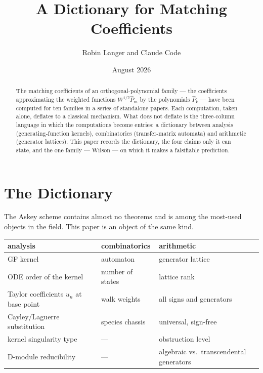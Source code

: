 \documentclass[11pt,a4paper]{article}
\title{\textbf{A Dictionary for Matching Coefficients}}
\author{Robin Langer and Claude Code}
\date{August 2026}
\begin{document}
\maketitle

\begin{abstract}
\noindent
The matching coefficients of an orthogonal-polynomial family --- the
coefficients approximating the weighted functions $W^{1/2}\widehat{P}_m$
by the polynomials $\widehat{P}_k$ --- have been computed for ten
families in a series of standalone papers. Each computation, taken
alone, deflates to a classical mechanism. What does not deflate is the
three-column language in which the computations become entries: a
dictionary between analysis (generating-function kernels), combinatorics
(transfer-matrix automata) and arithmetic (generator lattices). This
paper records the dictionary, the four claims only it can state, and the
one family --- Wilson --- on which it makes a falsifiable prediction.
\end{abstract}

\section{The Dictionary}

The Askey scheme contains almost no theorems and is among the most-used
objects in the field. This paper is an object of the same kind.

\begin{center}
\small
\begin{tabular}{lll}
\toprule
\textbf{analysis} & \textbf{combinatorics} & \textbf{arithmetic} \\
\midrule
GF kernel & automaton & generator lattice \\
ODE order of the kernel & number of states & lattice rank \\
Taylor coefficients $u_n$ at base point & walk weights & all signs and generators \\
Cayley/Laguerre substitution & species chassis & universal, sign-free \\
kernel singularity type & --- & obstruction level \\
D-module reducibility & --- & algebraic vs.\ transcendental generators \\
\bottomrule
\end{tabular}
\end{center}
\end{document}
